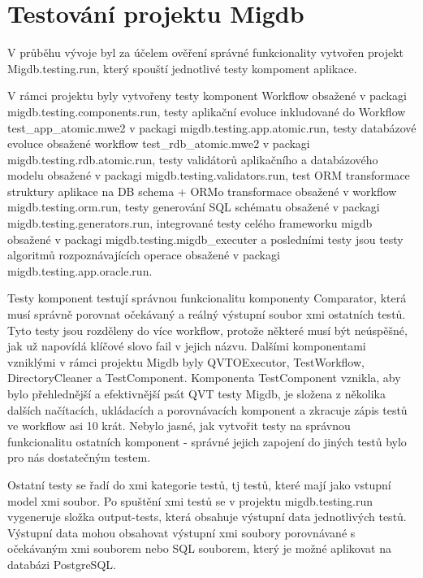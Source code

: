 \documentclass[11pt,twoside,a4paper]{book}
\begin{document}
\FloatBarrier



\chapter{Testování projektu Migdb}\label{chapt:testování}

V průběhu vývoje byl za účelem ověření správné funkcionality vytvořen projekt
Migdb.testing.run, který spouští jednotlivé testy kompoment aplikace. 

V rámci projektu byly vytvořeny testy komponent Workflow obsažené v packagi
migdb.testing.components.run, testy aplikační evoluce inkludované do Workflow
test\_app\_atomic.mwe2 v packagi migdb.testing.app.atomic.run, testy databázové
evoluce obsažené workflow test\_rdb\_atomic.mwe2 v packagi
migdb.testing.rdb.atomic.run, testy validátorů aplikačního a databázového
modelu obsažené v packagi migdb.testing.validators.run, test ORM transformace
struktury aplikace na DB schema + ORMo transformace obsažené v workflow
migdb.testing.orm.run, testy generování SQL schématu obsažené v packagi
migdb.testing.generators.run, integrované testy celého frameworku migdb
obsažené v packagi migdb.testing.migdb\_executer a posledními testy jsou testy
algoritmů rozpoznávajících operace obsažené v packagi
migdb.testing.app.oracle.run.

Testy komponent testují správnou funkcionalitu komponenty Comparator, která
musí správně porovnat očekávaný a reálný výstupní soubor xmi ostatních testů.
Tyto testy jsou rozděleny do více workflow, protože některé musí být neúspěšné,
jak už napovídá klíčové slovo fail v jejich názvu. Dalšími komponentami
vzniklými v rámci projektu Migdb byly QVTOExecutor, TestWorkflow,
DirectoryCleaner a TestComponent. Komponenta TestComponent vznikla, aby bylo
přehlednější a efektivnější psát QVT testy Migdb, je složena z několika dalších
načítacích, ukládacích a porovnávacích komponent a zkracuje zápis testů ve
workflow asi 10 krát. Nebylo jasné, jak vytvořit testy na správnou funkcionalitu
ostatních komponent - správné jejich zapojení do jiných testů bylo pro nás
dostatečným testem.

Ostatní testy se řadí do xmi kategorie testů, tj testů, které mají jako
vstupní model xmi soubor. Po spuštění xmi testů se v projektu
migdb.testing.run vygeneruje složka output-tests, která obsahuje výstupní data 
jednotlivých testů. Výstupní data mohou obsahovat výstupní xmi soubory
porovnávané s očekávaným xmi souborem nebo SQL souborem, který je možné
aplikovat na databázi PostgreSQL.
\end{document}
